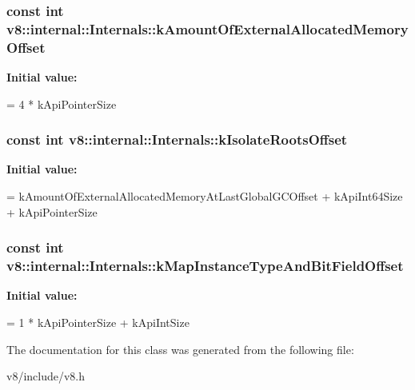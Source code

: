 \subsubsection[{k\+Amount\+Of\+External\+Allocated\+Memory\+Offset}]{\setlength{\rightskip}{0pt plus 5cm}const int v8\+::internal\+::\+Internals\+::k\+Amount\+Of\+External\+Allocated\+Memory\+Offset\hspace{0.3cm}{\ttfamily [static]}}\label{classv8_1_1internal_1_1Internals_a715b5e2c414c5efd35c5e01d4f2b9f85}
{\bfseries Initial value\+:}
\begin{DoxyCode}
=
      4 * kApiPointerSize
\end{DoxyCode}
\hypertarget{classv8_1_1internal_1_1Internals_a3142f942a25203ce7fca0e9a4563c74d}{}
\subsubsection[{k\+Isolate\+Roots\+Offset}]{\setlength{\rightskip}{0pt plus 5cm}const int v8\+::internal\+::\+Internals\+::k\+Isolate\+Roots\+Offset\hspace{0.3cm}{\ttfamily [static]}}\label{classv8_1_1internal_1_1Internals_a3142f942a25203ce7fca0e9a4563c74d}
{\bfseries Initial value\+:}
\begin{DoxyCode}
=
      kAmountOfExternalAllocatedMemoryAtLastGlobalGCOffset + kApiInt64Size +
      kApiPointerSize
\end{DoxyCode}
\hypertarget{classv8_1_1internal_1_1Internals_aeda3ec9bc2906bf6162b9cf3df9fd94a}{}
\subsubsection[{k\+Map\+Instance\+Type\+And\+Bit\+Field\+Offset}]{\setlength{\rightskip}{0pt plus 5cm}const int v8\+::internal\+::\+Internals\+::k\+Map\+Instance\+Type\+And\+Bit\+Field\+Offset\hspace{0.3cm}{\ttfamily [static]}}\label{classv8_1_1internal_1_1Internals_aeda3ec9bc2906bf6162b9cf3df9fd94a}
{\bfseries Initial value\+:}
\begin{DoxyCode}
=
      1 * kApiPointerSize + kApiIntSize
\end{DoxyCode}


The documentation for this class was generated from the following file\+:\begin{DoxyCompactItemize}
\item 
v8/include/v8.\+h\end{DoxyCompactItemize}
